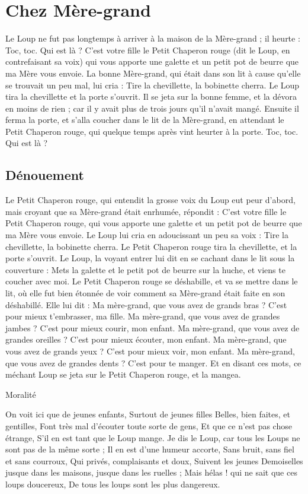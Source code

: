 \documentclass[a4paper,11pt]{article}
\begin{document}
\section{Chez Mère-grand}
Le Loup ne fut pas longtemps à arriver à la maison de la Mère-grand ; il heurte :
Toc, toc. Qui est là ? C'est votre fille le Petit Chaperon rouge (dit le Loup, en contrefaisant sa voix) qui vous apporte une galette et un petit pot de beurre que ma Mère vous envoie. La bonne Mère-grand, qui était dans son lit à cause qu'elle se trouvait un peu mal, lui cria : Tire la chevillette, la bobinette cherra.
Le Loup tira la chevillette et la porte s'ouvrit. Il se jeta sur la bonne femme, et la dévora en moins de rien ; car il y avait plus de trois jours qu'il n'avait mangé. Ensuite il ferma la porte, et s'alla coucher dans le lit de la Mère-grand, en attendant le Petit Chaperon rouge, qui quelque temps après vint heurter à la porte. Toc, toc. Qui est là ?

\subsection{Dénouement}
Le Petit Chaperon rouge, qui entendit la grosse voix du Loup eut peur d'abord, mais croyant que sa Mère-grand était enrhumée, répondit : C'est votre fille le Petit Chaperon rouge, qui vous apporte une galette et un petit pot de beurre que ma Mère vous envoie. Le Loup lui cria en adoucissant un peu sa voix : Tire la chevillette, la bobinette cherra. Le Petit Chaperon rouge tira la chevillette, et la porte s'ouvrit. Le Loup, la voyant entrer lui dit en se cachant dans le lit sous la couverture : Mets la galette et le petit pot de beurre sur la huche, et viens te coucher avec moi. Le Petit Chaperon rouge se déshabille, et va se mettre dans le lit, où elle fut bien étonnée de voir comment sa Mère-grand était faite en son déshabillé. Elle lui dit : Ma mère-grand, que vous avez de grands bras ? C'est pour mieux t'embrasser, ma fille. Ma mère-grand, que vous avez de grandes jambes ? C'est pour mieux courir, mon enfant. Ma mère-grand, que vous avez de grandes oreilles ?
C'est pour mieux écouter, mon enfant. Ma mère-grand, que vous avez de grands yeux ? C'est pour mieux voir, mon enfant. Ma mère-grand, que vous avez de grandes dents ? C'est pour te manger. Et en disant ces mots, ce méchant Loup se jeta sur le Petit Chaperon rouge, et la mangea.

Moralité

On voit ici que de jeunes enfants, Surtout de jeunes filles Belles, bien faites, et gentilles, Font très mal d'écouter toute sorte de gens, Et que ce n'est pas chose étrange, S'il en est tant que le Loup mange.
Je dis le Loup, car tous les Loups ne sont pas de la même sorte ; Il en est d'une humeur accorte, Sans bruit, sans fiel et sans courroux, Qui privés, complaisants et doux, Suivent les jeunes Demoiselles jusque dans les maisons, jusque dans les ruelles ; Mais hélas ! qui ne sait que ces loups doucereux, De tous les loups sont les plus dangereux.
\end{document}

